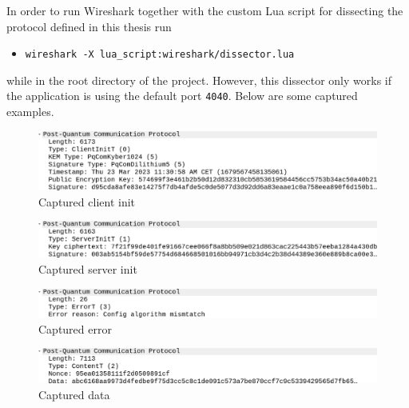 In order to run Wireshark together with the custom Lua script for dissecting the protocol defined in this thesis run
\begin{itemize}
  \item \texttt{wireshark -X lua\_script:wireshark/dissector.lua}
\end{itemize}
while in the root directory of the project. However, this dissector only works if the application is using the default port \texttt{4040}. Below are some captured examples.
\begin{figure}[ht!]
  \centering
  \includegraphics[width=\textwidth]{pictures/clientinit.png}
  \caption{Captured client init}
  \label{img:cap_clientinit}
\end{figure}

\begin{figure}[ht!]
  \centering
  \includegraphics[width=\textwidth]{pictures/serverinit.png}
  \caption{Captured server init}
  \label{img:cap_serverinit}
\end{figure}

\begin{figure}[ht!]
  \centering
  \includegraphics[width=\textwidth]{pictures/error.png}
  \caption{Captured error}
  \label{img:cap_error}
\end{figure}

\begin{figure}[ht!]
  \centering
  \includegraphics[width=\textwidth]{pictures/data.png}
  \caption{Captured data}
  \label{img:cap_data}
\end{figure}
